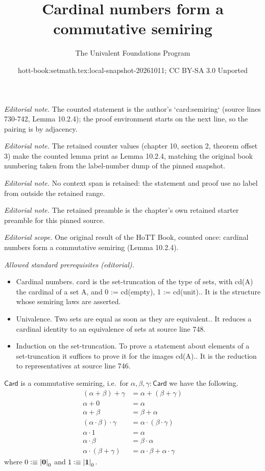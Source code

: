 \documentclass[10pt,a4paper]{article}
\title{Cardinal numbers form a commutative semiring}
\author{The Univalent Foundations Program}
\date{hott-book:setmath.tex:local-snapshot-20261011; CC BY-SA 3.0 Unported}
\newcounter{chapter}
\providecommand{\index}[1]{}
\newcommand{\defeq}{\vcentcolon\equiv}  %
\newcommand{\card}{\ensuremath{\mathsf{Card}}\xspace}
\newcommand{\tproj}[3][]{\mathopen{}\left|#3\right|_{#2}^{#1}\mathclose{}}
\newcommand{\emptyt}{\ensuremath{\mathbf{0}}\xspace}
\newcommand{\unit}{\ensuremath{\mathbf{1}}\xspace}
\def\cd{\tproj0}
\theoremstyle{definition}
\theoremstyle{remark}
\numberwithin{equation}{section}
\begin{document}
\maketitle
\setcounter{chapter}{10}
\setcounter{section}{2}
\setcounter{thm}{3}
\noindent\textit{Editorial note.} The counted statement is the author's `card:semiring` (source lines 730-742, Lemma 10.2.4); the proof environment starts on the next line, so the pairing is by adjacency.\par\medskip
\noindent\textit{Editorial note.} The retained counter values (chapter 10, section 2, theorem offset 3) make the counted lemma print as Lemma 10.2.4, matching the original book numbering taken from the label-number dump of the pinned snapshot.\par\medskip
\noindent\textit{Editorial note.} No context span is retained: the statement and proof use no label from outside the retained range.\par\medskip
\noindent\textit{Editorial note.} The retained preamble is the chapter's own retained starter preamble for this pinned source.\par\medskip
\noindent\textit{Editorial scope.} One original result of the HoTT Book, counted once: cardinal numbers form a commutative semiring (Lemma 10.2.4).\par\medskip
\noindent\textit{Allowed standard prerequisites (editorial).}\begin{itemize}
\item Cardinal numbers. card is the set-truncation of the type of sets, with cd(A) the cardinal of a set A, and 0 := cd(empty), 1 := cd(unit).. It is the structure whose semiring laws are asserted.
\item Univalence. Two sets are equal as soon as they are equivalent.. It reduces a cardinal identity to an equivalence of sets at source line 748.
\item Induction on the set-truncation. To prove a statement about elements of a set-truncation it suffices to prove it for the images cd(A).. It is the reduction to representatives at source line 746.
\end{itemize}\medskip
\begin{lem}\label{card:semiring}
  \card is a commutative semiring\index{semiring}, i.e.\ for $\alpha,\beta,\gamma:\card$ we have the following.
  \begin{align*}
    (\alpha+\beta)+\gamma &= \alpha+(\beta+\gamma)\\
    \alpha+0 &= \alpha\\
    \alpha + \beta &= \beta + \alpha\\
    (\alpha \cdot \beta) \cdot \gamma &= \alpha \cdot (\beta\cdot\gamma)\\
    \alpha \cdot 1 &= \alpha\\
    \alpha\cdot\beta &= \beta\cdot\alpha\\
    \alpha\cdot(\beta+\gamma) &= \alpha\cdot\beta + \alpha\cdot\gamma
  \end{align*}
  where $0 \defeq \cd{\emptyt}$ and $1\defeq\cd{\unit}$.
\end{lem}
\end{document}
